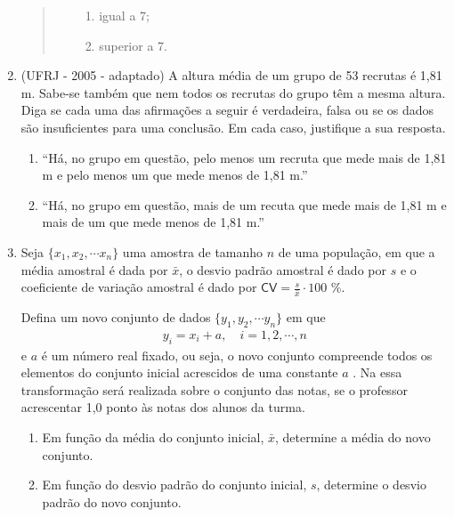 \begin{enumerate}
\begin{quote}
\begin{enumerate}
\begin{enumerate}
\item {} 
igual a 7;

\item {} 
superior a 7.

\end{enumerate}

\end{enumerate}
\end{quote}

\item (UFRJ - 2005 - adaptado)  A altura média de um grupo de 53 recrutas é 1,81 m. Sabe-se também que nem todos os recrutas do grupo têm a mesma altura. Diga se cada uma das afirmações a seguir é verdadeira, falsa ou se os dados são insuficientes para uma conclusão. Em cada caso, justifique a sua resposta.
\begin{enumerate}
\item {} 
“Há, no grupo em questão, pelo menos um recruta que mede mais de 1,81 m e pelo menos um que mede menos de 1,81 m.”

\item {} 
“Há, no grupo em questão, mais de um recuta que mede mais de 1,81 m e mais de um que mede menos de 1,81 m.”

\end{enumerate}

\item Seja \(\{x_1,x_2,\cdots x_n\}\) uma amostra de tamanho \(n\) de uma população, em que a média amostral é dada por \(\bar{x}\), o desvio padrão amostral é dado por \(s\) e o coeficiente de variação amostral é dado por \(\textsf{CV}=\frac{s}{\bar{x}}\cdot 100\) \%.

Defina um novo conjunto de dados \(\{y_1,y_2,\cdots y_n\}\) em que
\begin{equation*}
\begin{split}y_i=x_i+a,\quad  i=1,2,\cdots, n\end{split}
\end{equation*}
e \(a\) é um número real fixado, ou seja, o novo conjunto compreende todos os elementos do conjunto inicial acrescidos de uma constante \(a\) . Na  essa transformação será realizada sobre o conjunto das notas, se o professor acrescentar 1,0 ponto às notas dos alunos da turma.
\begin{enumerate}
\item {} 
Em função da média do conjunto inicial, \(\bar{x}\), determine a média do novo conjunto.

\item {} 
Em função do desvio padrão do conjunto inicial, \(s\), determine o desvio padrão do novo conjunto.


\end{enumerate}
\end{enumerate}
